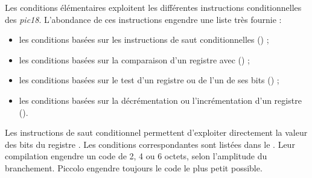 
Les conditions élémentaires exploitent les différentes instructions conditionnelles des \emph{pic18}. L'abondance de ces instructions engendre une liste très fournie :
\begin{itemize}
  \item les conditions basées sur les instructions de saut conditionnelles () ;
  \item les conditions basées sur la comparaison d'un registre avec  () ;
  \item les conditions basées sur le test d'un registre ou de l'un de ses bits () ;
  \item les conditions basées sur la décrémentation ou l'incrémentation d'un registre ().
\end{itemize}


Les instructions de saut conditionnel permettent d'exploiter directement la valeur des bits du registre . Les conditions correspondantes sont listées dans le . Leur compilation engendre un code de 2, 4 ou 6 octets, selon l'amplitude du branchement. Piccolo engendre toujours le code le plus petit possible.

